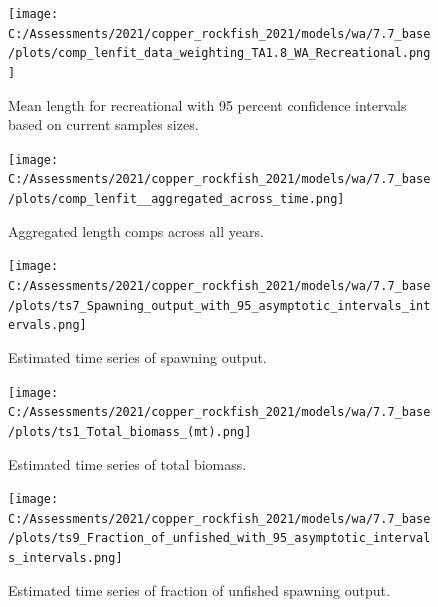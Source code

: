 \documentclass[11pt,
  english,
  a4paper,
]{article}
\begin{document}
\tagmcend\tagstructend


\begin{figure}
\centering
\texttt{[image: C:/Assessments/2021/copper\_rockfish\_2021/models/wa/7.7\_base/plots/comp\_lenfit\_data\_weighting\_TA1.8\_WA\_Recreational.png]}
\caption{Mean length for recreational with 95 percent confidence intervals based on current samples sizes.\label{fig:rec-mean-len-fit}}
\end{figure}

\tagmcend\tagstructend


\begin{figure}
\centering
\texttt{[image: C:/Assessments/2021/copper\_rockfish\_2021/models/wa/7.7\_base/plots/comp\_lenfit\_\_aggregated\_across\_time.png]}
\caption{Aggregated length comps across all years.\label{fig:agg-len-fit}}
\end{figure}

\tagmcend\tagstructend


\begin{figure}
\centering
\texttt{[image: C:/Assessments/2021/copper\_rockfish\_2021/models/wa/7.7\_base/plots/ts7\_Spawning\_output\_with\_95\_asymptotic\_intervals\_intervals.png]}
\caption{Estimated time series of spawning output.\label{fig:ssb}}
\end{figure}

\tagmcend\tagstructend


\begin{figure}
\centering
\texttt{[image: C:/Assessments/2021/copper\_rockfish\_2021/models/wa/7.7\_base/plots/ts1\_Total\_biomass\_(mt).png]}
\caption{Estimated time series of total biomass.\label{fig:tot-bio}}
\end{figure}

\tagmcend\tagstructend


\begin{figure}
\centering
\texttt{[image: C:/Assessments/2021/copper\_rockfish\_2021/models/wa/7.7\_base/plots/ts9\_Fraction\_of\_unfished\_with\_95\_asymptotic\_intervals\_intervals.png]}
\caption{Estimated time series of fraction of unfished spawning output.\label{fig:depl}}
\end{figure}
\end{document}
